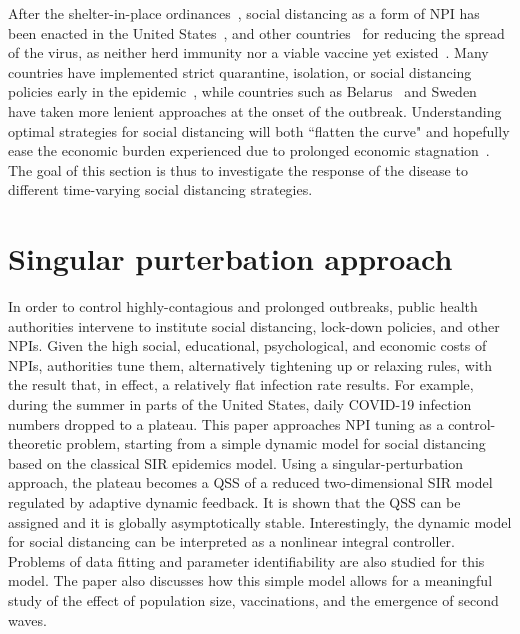 After the shelter-in-place ordinances~\cite{wright2020poverty}, social distancing as a form of \ac{NPI} has been enacted in the United States~\cite{wolf2020awareness}, and other countries~\cite{thu2020effect,sarin2020coronavirus} for reducing the spread of the virus, as neither herd immunity nor a viable vaccine yet existed~\cite{mcdonnell2020covid}. 
Many countries have implemented strict quarantine, isolation, or social distancing policies early in the epidemic~\cite{thu2020effect}, while countries such as Belarus~\cite{gritsenko2020covid} and Sweden~\cite{dahlberg2020effects, cho2020quantifying} have taken more lenient approaches at the onset of the outbreak. 
Understanding optimal strategies for social distancing will both ``flatten the curve" and hopefully ease the economic burden experienced due to prolonged economic stagnation~\cite{berman2020distributional, courtemanche2020strong, maloney2020determinants}. The goal of this section is thus to investigate the response of the disease to different time-varying social distancing strategies.

\section{Singular purterbation approach}

In order to control highly-contagious and prolonged outbreaks, public health authorities intervene to institute social distancing, lock-down policies, and other \ac{NPI}s. Given the high social, educational, psychological, and economic costs of \ac{NPI}s, authorities tune them, alternatively tightening up or relaxing rules, with the result that, in effect, a relatively flat infection rate results.  
For example, during the summer in parts of the United States, daily COVID-19 infection numbers dropped to a plateau.
This paper approaches \ac{NPI} tuning as a control-theoretic problem, starting from a simple dynamic model for social distancing based on the classical SIR epidemics model.
Using a singular-perturbation approach,
the plateau becomes a 
\ac{QSS} of a reduced two-dimensional SIR model regulated by adaptive dynamic feedback.
It is shown that the \ac{QSS} can be assigned and it is globally asymptotically stable. Interestingly, the dynamic model for social distancing can be interpreted as a nonlinear integral controller.  Problems of data fitting and parameter identifiability are also studied for this model.  The paper also discusses how this simple model allows for a meaningful study of the effect of population size, 
vaccinations, and the emergence of second waves.


